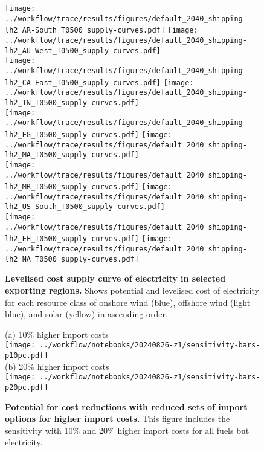 \begin{figure}[!htb]
    \footnotesize
    \centering
    \texttt{[image: ../workflow/trace/results/figures/default\_2040\_shipping-lh2\_AR-South\_T0500\_supply-curves.pdf]}
    \texttt{[image: ../workflow/trace/results/figures/default\_2040\_shipping-lh2\_AU-West\_T0500\_supply-curves.pdf]} \\
    \texttt{[image: ../workflow/trace/results/figures/default\_2040\_shipping-lh2\_CA-East\_T0500\_supply-curves.pdf]}
    \texttt{[image: ../workflow/trace/results/figures/default\_2040\_shipping-lh2\_TN\_T0500\_supply-curves.pdf]} \\
    \texttt{[image: ../workflow/trace/results/figures/default\_2040\_shipping-lh2\_EG\_T0500\_supply-curves.pdf]}
    \texttt{[image: ../workflow/trace/results/figures/default\_2040\_shipping-lh2\_MA\_T0500\_supply-curves.pdf]} \\
    \texttt{[image: ../workflow/trace/results/figures/default\_2040\_shipping-lh2\_MR\_T0500\_supply-curves.pdf]}
    \texttt{[image: ../workflow/trace/results/figures/default\_2040\_shipping-lh2\_US-South\_T0500\_supply-curves.pdf]} \\
    \texttt{[image: ../workflow/trace/results/figures/default\_2040\_shipping-lh2\_EH\_T0500\_supply-curves.pdf]}
    \texttt{[image: ../workflow/trace/results/figures/default\_2040\_shipping-lh2\_NA\_T0500\_supply-curves.pdf]} \\

    \caption{\textbf{Levelised cost supply curve of electricity in selected
    exporting regions.} Shows potential and levelised cost of electricity for
    each resource class of onshore wind (blue), offshore wind (light blue), and solar (yellow) in ascending order.}
    \label{fig:si:lcoe-curve}
\end{figure}

\begin{figure}[!htb]
    \footnotesize
    (a) 10\% higher import costs \\
    \texttt{[image: ../workflow/notebooks/20240826-z1/sensitivity-bars-p10pc.pdf]} \\
    (b) 20\% higher import costs \\
    \texttt{[image: ../workflow/notebooks/20240826-z1/sensitivity-bars-p20pc.pdf]} \\
    \caption{\textbf{Potential for cost reductions with reduced sets of import
    options for higher import costs.} This figure includes the sensitivity with
    10\% and 20\% higher import costs for all fuels but electricity.}
    \label{fig:si:subsets-higher}
\end{figure}




